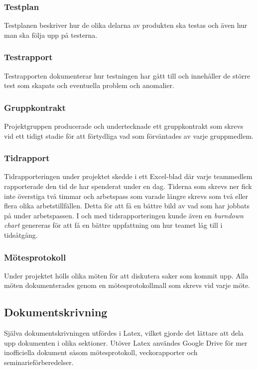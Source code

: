 \subsubsection*{Testplan}
Testplanen beskriver hur de olika delarna av produkten ska testas och även hur man ska följa upp på testerna.

\subsubsection*{Testrapport}
Testrapporten dokumenterar hur testningen har gått till och innehåller de större test som skapats och eventuella problem och anomalier.

\subsubsection*{Gruppkontrakt}
Projektgruppen producerade och undertecknade ett gruppkontrakt som skrevs vid ett tidigt stadie för att förtydliga vad som förväntades av varje gruppmedlem.

\subsubsection*{Tidrapport}
Tidrapporteringen under projektet skedde i ett Excel-blad där varje teammedlem rapporterade den tid de har spenderat under en dag. Tiderna som skrevs ner fick inte överstiga två timmar och arbetspass som varade längre skrevs som två eller flera olika arbetstillfällen. Detta för att få en bättre bild av vad som har jobbats på under arbetspassen. I och med tidsrapporteringen kunde även en \textit{burndown chart} genereras för att få en bättre uppfattning om hur teamet låg till i tidsåtgång.

\subsubsection*{Mötesprotokoll}
Under projektet hölls olika möten för att diskutera saker som kommit upp. Alla möten dokumenterades genom en mötesprotokollmall som skrevs vid varje möte.

\subsection{Dokumentskrivning}
Själva dokumentskrivningen utfördes i Latex, vilket gjorde det lättare att dela upp dokumenten i olika sektioner. Utöver Latex användes Google Drive för mer inofficiella dokument såsom mötesprotokoll, veckorapporter och seminarieförberedelser.

